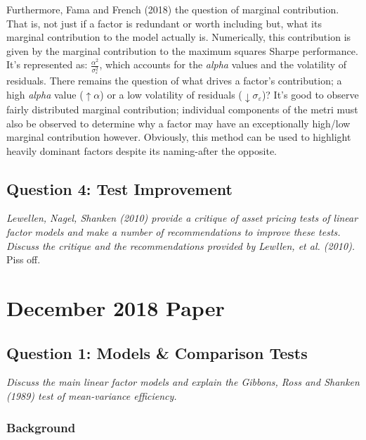 \documentclass[11pt, english]{article}
\begin{document}
        Furthermore, Fama and French (2018) the question of marginal contribution. That is, not just if a factor is redundant or worth including but, what its marginal contribution to the model actually is. Numerically, this contribution is given by the marginal contribution to the maximum squares Sharpe performance. It's represented as: $\frac{\alpha^2}{\sigma_{\varepsilon}^2}$, which accounts for the \textit{alpha} values and the volatility of residuals. There remains the question of what drives a factor’s contribution; a high \textit{alpha} value ($\uparrow\alpha$) or a low volatility of residuals ($\downarrow\sigma_{\varepsilon}$)? It's good to observe fairly distributed marginal contribution; individual components of the metri must also be observed to determine why a factor may have an exceptionally high/low marginal contribution however. Obviously, this method can be used to highlight heavily dominant factors despite its naming-after the opposite.

	\newpage

	\subsection{Question 4: Test Improvement}

	\textit{Lewellen, Nagel, Shanken (2010) provide a critique of asset pricing tests of linear factor models and make a number of recommendations to improve these tests. Discuss the critique and the recommendations provided by Lewllen, et al. (2010).}\\

	Piss off.

\newpage

\section{December 2018 Paper}

	\subsection{Question 1: Models \& Comparison Tests}
        
	\textit{Discuss the main linear factor models and explain the Gibbons, Ross and Shanken (1989) test of mean-variance efficiency.}

		\subsubsection*{Background}
\end{document}

